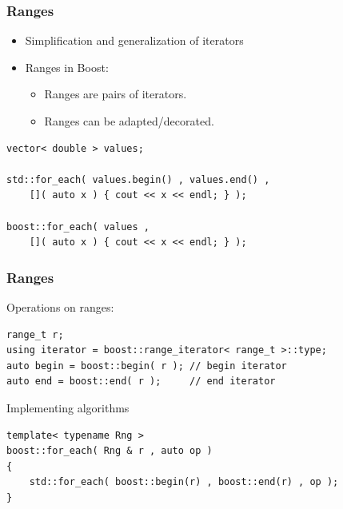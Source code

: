 \documentclass{beamer}
\newcommand{\heading}[1]{\frametitle{#1}}
\begin{document}
\begin{frame}[fragile]
  \heading{Ranges}
  
  \begin{itemize}
   \item Simplification and generalization of iterators
   \item Ranges in Boost:
   \begin{itemize}
    \item Ranges are pairs of iterators.
    \item Ranges can be adapted/decorated.
   \end{itemize}
  \end{itemize}


  \begin{lstlisting}[basicstyle=\scriptsize\ttfamily]
vector< double > values;

std::for_each( values.begin() , values.end() ,
    []( auto x ) { cout << x << endl; } );

boost::for_each( values ,
    []( auto x ) { cout << x << endl; } );
  \end{lstlisting}
  

\end{frame}


\begin{frame}[fragile]
 \heading{Ranges}
 
  Operations on ranges:
  \begin{lstlisting}[basicstyle=\scriptsize\ttfamily]
range_t r;
using iterator = boost::range_iterator< range_t >::type;
auto begin = boost::begin( r ); // begin iterator
auto end = boost::end( r );     // end iterator
  \end{lstlisting}
  
  \pause
  
  \vspace{2ex}
  Implementing algorithms
  \begin{lstlisting}[basicstyle=\scriptsize\ttfamily]
template< typename Rng >
boost::for_each( Rng & r , auto op )
{
    std::for_each( boost::begin(r) , boost::end(r) , op );
}
  \end{lstlisting}


\end{frame}
\end{document}
